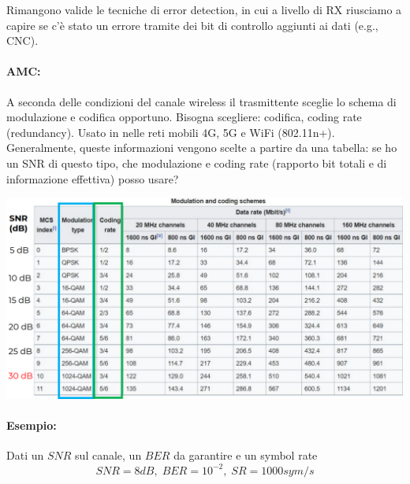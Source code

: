 Rimangono valide le tecniche di error detection, in cui a livello di RX riusciamo a capire se c'è stato un errore tramite dei bit di controllo aggiunti ai dati (e.g., CNC).

\paragraph{AMC:} A seconda delle condizioni del canale wireless il trasmittente sceglie lo schema di modulazione e codifica opportuno. Bisogna scegliere: codifica, coding rate (redundancy). Usato in nelle reti mobili 4G, 5G e WiFi (802.11n+). Generalmente, queste informazioni vengono scelte a partire da una tabella: se ho un SNR di questo tipo, che modulazione e coding rate (rapporto bit totali e di informazione effettiva) posso usare?  
\begin{center}
	\includegraphics[width=0.95\linewidth]{img/wireless/mcruppolo}
\end{center}



\paragraph{Esempio:} Dati un $SNR$ sul canale, un $BER$ da garantire e un symbol rate
$$ SNR = 8dB, \; BER = 10^{-2}, \; SR = 1000 sym/s$$

